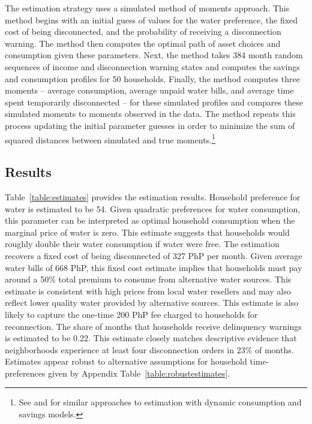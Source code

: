 \documentclass[12pt]{article}
\begin{document}
The estimation strategy uses a simulated method of moments approach.  This method begins with an initial guess of values for the water preference, the fixed cost of being disconnected, and the probability of receiving a disconnection warning.  The method then computes the optimal path of asset choices and consumption given these parameters.  Next, the method takes 384 month random sequences of income and disconnection warning states and computes the savings and consumption profiles for 50 households.  Finally, the method computes three moments -- average consumption, average unpaid water bills, and average time spent temporarily disconnected -- for these simulated profiles and compares these simulated moments to moments observed in the data.  The method repeats this process updating the initial parameter guesses in order to minimize the sum of squared distances between simulated and true moments.\footnote{See \cite{laibson2007estimating} and \cite{gourinchas2002consumption} for similar approaches to estimation with dynamic consumption and savings models.}

\subsection{Results}\label{section:results}

Table~\ref{table:estimates} provides the estimation results.  Household preference for water is estimated to be 54.  Given quadratic preferences for water consumption, this parameter can be interpreted as optimal household consumption when the marginal price of water is zero.  This estimate suggests that households would roughly double their water consumption if water were free.  The estimation recovers a fixed cost of being disconnected of 327 PhP per month.  Given average water bills of 668 PhP, this fixed cost estimate implies that households must pay around a 50\% total premium to consume from alternative water sources.  This estimate is consistent with high prices from local water resellers and may also reflect lower quality water provided by alternative sources.  This estimate is also likely to capture the one-time 200 PhP fee charged to households for reconnection.  The share of months that households receive delinquency warnings is estimated to be 0.22.  This estimate closely matches descriptive evidence that neighborhoods experience at least four disconnection orders in 23\unskip\% of months.  Estimates appear robust to alternative assumptions for household time-preferences given by Appendix Table~\ref{table:robustestimates}.  
\end{document}
